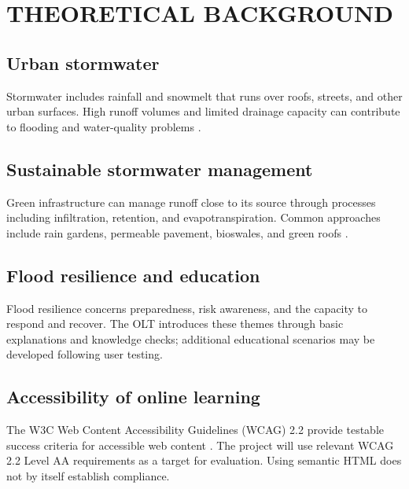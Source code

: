 \chapter{THEORETICAL BACKGROUND}
\section{Urban stormwater}
Stormwater includes rainfall and snowmelt that runs over roofs, streets, and other urban surfaces. High runoff volumes and limited drainage capacity can contribute to flooding and water-quality problems \parencite{epaGreenInfrastructure}.

\section{Sustainable stormwater management}
Green infrastructure can manage runoff close to its source through processes including infiltration, retention, and evapotranspiration. Common approaches include rain gardens, permeable pavement, bioswales, and green roofs \parencite{epaGreenTypes}.

\section{Flood resilience and education}
Flood resilience concerns preparedness, risk awareness, and the capacity to respond and recover. The OLT introduces these themes through basic explanations and knowledge checks; additional educational scenarios may be developed following user testing.

\section{Accessibility of online learning}
The W3C Web Content Accessibility Guidelines (WCAG) 2.2 provide testable success criteria for accessible web content \parencite{wcag22}. The project will use relevant WCAG 2.2 Level AA requirements as a target for evaluation. Using semantic HTML does not by itself establish compliance.
